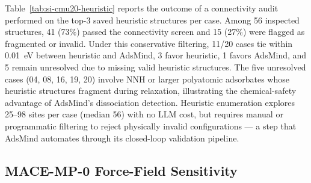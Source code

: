 \documentclass[%
 preprint,
 superscriptaddress,
 amsmath,amssymb,
 aps,
 prb,
 floatfix,
]{revtex4-2}
\begin{document}
\begin{table}[ht]
\centering
\scriptsize
\caption{CMU20 heuristic enumeration after saved-top-3 connectivity audit (1{,}137 Autoadsorbate sites, median 56 sites/case, range 25--98). The audit checked 56 saved top-3 structures; 41 passed the connectivity screen, 15 were flagged as fragmented or invalid.}
\label{tab:si-cmu20-heuristic}
\end{table}

Table~\ref{tab:si-cmu20-heuristic} reports the outcome of a connectivity audit performed on the top-3 saved heuristic structures per case. Among 56 inspected structures, 41 (73\%) passed the connectivity screen and 15 (27\%) were flagged as fragmented or invalid. Under this conservative filtering, 11/20 cases tie within 0.01~eV between heuristic and AdsMind, 3 favor heuristic, 1 favors AdsMind, and 5 remain unresolved due to missing valid heuristic structures. The five unresolved cases (04, 08, 16, 19, 20) involve NNH or larger polyatomic adsorbates whose heuristic structures fragment during relaxation, illustrating the chemical-safety advantage of AdsMind's dissociation detection. Heuristic enumeration explores 25--98 sites per case (median 56) with no LLM cost, but requires manual or programmatic filtering to reject physically invalid configurations --- a step that AdsMind automates through its closed-loop validation pipeline.

\subsection{MACE-MP-0 Force-Field Sensitivity}
\end{document}
